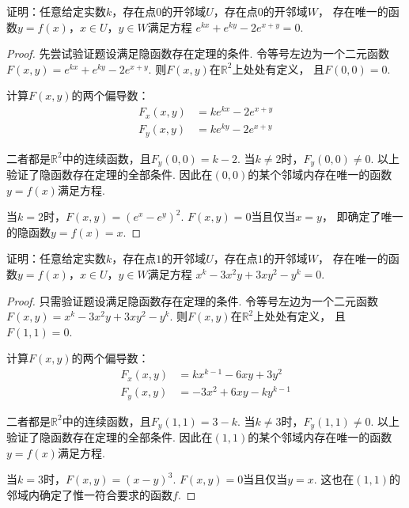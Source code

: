 \begin{example}[2022 A卷]
\label{ex:ch06-16}
证明：任意给定实数$k$，存在点$0$的开邻域$U$，存在点$0$的开邻域$W$，
存在唯一的函数$y=f(x)$，$x \in U$，$y \in W$满足方程
$e^{kx} + e^{ky} - 2e^{x+y} = 0$.
\end{example}

\begin{proof}
先尝试验证题设满足隐函数存在定理的条件.
令等号左边为一个二元函数$F(x,y) = e^{kx} + e^{ky} - 2e^{x+y}$.
则$F(x,y)$在$\mathbb{R}^2$上处处有定义，
且$F(0,0) = 0$.\par
计算$F(x,y)$的两个偏导数：
\begin{equation}
    \begin{aligned}
        F_{x}(x,y) &= k e^{kx} - 2e^{x+y} \\
        F_{y}(x,y) &= k e^{ky} -2e^{x+y}
        \nonumber
    \end{aligned}
\end{equation}\par
二者都是$\mathbb{R}^2$中的连续函数，且$F_{y}(0,0) = k - 2$.
当$k \ne 2$时，$F_{y}(0,0) \ne 0$.
以上验证了隐函数存在定理的全部条件.
因此在$(0,0)$的某个邻域内存在唯一的函数$y=f(x)$满足方程.\par
当$k = 2$时，$F(x,y) = (e^x - e^y)^2$. $F(x,y)= 0$当且仅当$x=y$，
即确定了唯一的隐函数$y = f(x) = x$.
\end{proof}

\begin{example}[2022 B卷]
\label{ex:ch06-17}
证明：任意给定实数$k$，存在点$1$的开邻域$U$，存在点$1$的开邻域$W$，
存在唯一的函数$y=f(x)$，$x \in U$，$y \in W$满足方程
$x^k - 3x^2 y + 3x y^2 - y^k = 0$.
\end{example}

\begin{proof}
只需验证题设满足隐函数存在定理的条件.
令等号左边为一个二元函数$F(x,y) = x^k - 3x^2 y + 3x y^2 - y^k$.
则$F(x,y)$在$\mathbb{R}^2$上处处有定义，
且$F(1,1) = 0$.\par
计算$F(x,y)$的两个偏导数：
\begin{equation}
    \begin{aligned}
        F_{x}(x,y) &= k x^{k-1} -6xy + 3y^2 \\
        F_{y}(x,y) &= -3x^2 + 6xy -k y^{k-1}
        \nonumber
    \end{aligned}
\end{equation}\par
二者都是$\mathbb{R}^2$中的连续函数，且$F_{y}(1,1) = 3-k$.
当$k \ne 3$时，$F_{y}(1,1) \ne 0$.
以上验证了隐函数存在定理的全部条件.
因此在$(1,1)$的某个邻域内存在唯一的函数$y=f(x)$满足方程.\par
当$k = 3$时，$F(x,y) = (x - y)^3$. $F(x,y)= 0$当且仅当$y=x$.
这也在$(1,1)$的邻域内确定了惟一符合要求的函数$f$.
\end{proof}

